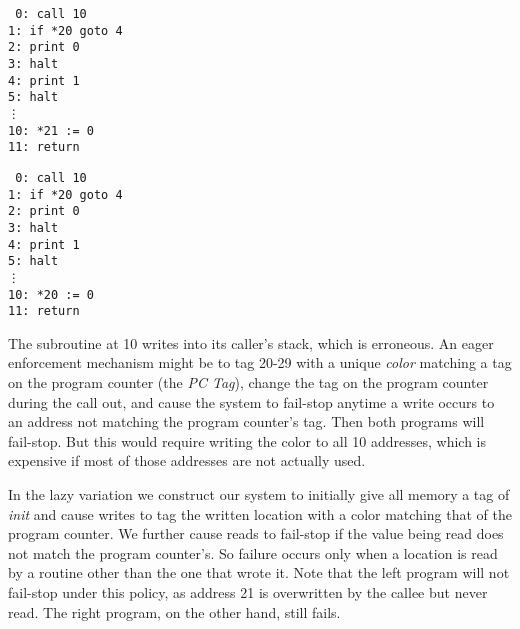 \documentclass{article}
\begin{document}
      \vspace*{0.2in}
      \begin{minipage}{.45\textwidth}
        \noindent
        {\tt
          0: call 10 \\
          1: if *20 goto 4 \\
          2: print 0 \\
          3: halt \\
          4: print 1 \\
          5: halt \\
          \vdots \\
          10: *21 := 0 \\
          11: return
          }
      \end{minipage}
      \begin{minipage}{.45\textwidth}
        \noindent
        {\tt
          0: call 10 \\
          1: if *20 goto 4 \\
          2: print 0 \\
          3: halt \\
          4: print 1 \\
          5: halt \\
          \vdots \\
          10: *20 := 0 \\
          11: return
          }
     \end{minipage}
      \vspace*{0.2in}

      The subroutine at 10 writes into its caller's stack, which is erroneous. An eager enforcement mechanism might
      be to tag 20-29 with a unique {\it color} matching a tag on the program counter (the {\it PC Tag}), change the
      tag on the program counter during the call out, and cause the system to fail-stop anytime a write occurs to an
      address not matching the program counter's tag. Then both programs will fail-stop. But this would require writing
      the color to all 10 addresses, which is expensive if most of those addresses are not actually used.

      In the lazy variation we construct our system to initially give all memory a tag of {\it init} and cause
      writes to tag the written location with a color matching that of the program counter. We further cause
      reads to fail-stop if the value being read does not match the program counter's. So failure occurs only when
      a location is read by a routine other than the one that wrote it. Note that the left program will not fail-stop
      under this policy, as address 21 is overwritten by the callee but never read. The right program, on the other
      hand, still fails.
\end{document}
